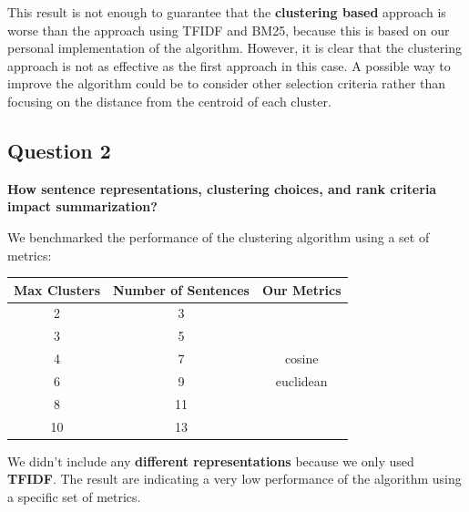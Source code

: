 This result is not enough to guarantee that the \textbf{clustering based} approach is
worse than the approach using TFIDF and BM25, because this is based on our
personal implementation of the algorithm. However, it is clear that the
clustering approach is not as effective as the first approach in this case. A
possible way to improve the algorithm could be to consider other selection criteria rather than focusing on the distance from the centroid of each cluster.

\subsection{Question 2}
\textbf{How sentence representations, clustering choices, and rank criteria impact summarization?}

We benchmarked the performance of the clustering algorithm using a set of
metrics:
\begin{table}[H]
  \centering
  \begin{tabular}{|c|c|c|}
    \hline
    \textbf{Max Clusters} & \textbf{Number of Sentences} & \textbf{Our Metrics} \\
    \hline
    2                     & 3                            &                      \\
    3                     & 5                            &                      \\
    4                     & 7                            & cosine               \\
    6                     & 9                            & euclidean            \\
    8                     & 11                           &                      \\
    10                    & 13                           &                      \\
    \hline
  \end{tabular}
\end{table}

We didn't include any \textbf{different representations} because we only used \textbf{TFIDF}. The result are indicating a very low
performance of the algorithm using a specific set of metrics.

